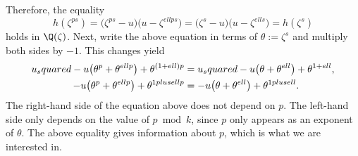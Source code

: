Therefore, the equality
\begin{equation*}
h(\zeta^{ps})=\big(\zeta^{ps}-{u}\big)\big({{u}}-\zeta^{{ell}ps}\big)=\big(\zeta^{s}-{u}\big)\big({{u}}-\zeta^{{ell}s}\big)=h(\zeta^{s})
\end{equation*}
holds in $\Q(\zeta)$. Next, write the above equation in terms of $\theta:=\zeta^{s}$ and multiply both sides by $-1$. This changes yield
\begin{align}
{u_squared}-{{u}}\big(\theta^{p}+\theta^{{ell}p}\big)+\theta^{(1+{ell})p}&={u_squared}-{{u}}\big(\theta+\theta^{{ell}}\big)+\theta^{1+{ell}}, \notag \\
-{u}\big(\theta^{p}+\theta^{{ell}p}\big)+\theta^{{1plusell}p}&=-{u}\big(\theta+\theta^{{ell}}\big)+\theta^{{1plusell}}\label{eq:equality_in_theta}.
\end{align}
The right-hand side of the equation above does not depend on $p$. The left-hand side only depends on the value of $p\bmod{{k}}$, since $p$ only appears as an exponent of $\theta$. The above equality gives information about $p$, which is what we are interested in. 

